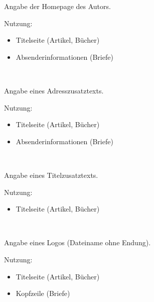 \DescribeMacro{\homepage}
Angabe der Homepage des Autors.

Nutzung:
\begin{itemize}
	\item Titelseite (Artikel, Bücher)
	\item Absenderinformationen (Briefe)
\end{itemize}

\begin{nutzung}
		\>\\
	\beispiel
		\>
\end{nutzung}

\DescribeMacro{\adresszusatz}
Angabe eines Adresszusatztexts.

Nutzung:
\begin{itemize}
	\item Titelseite (Artikel, Bücher)
	\item Absenderinformationen (Briefe)
\end{itemize}

\begin{nutzung}
		\>\\
	\beispiel
		\>
\end{nutzung}

\DescribeMacro{\titelzusatz}
Angabe eines Titelzusatztexts.

Nutzung:
\begin{itemize}
	\item Titelseite (Artikel, Bücher)
\end{itemize}

\begin{nutzung}
		\>\\
	\beispiel
		\>
\end{nutzung}

\DescribeMacro{\logo}
Angabe eines Logos (Dateiname ohne Endung).

Nutzung:
\begin{itemize}
	\item Titelseite (Artikel, Bücher)
	\item Kopfzeile (Briefe)
\end{itemize}

\begin{nutzung}
		\>\\
	\beispiel
		\>
\end{nutzung}


